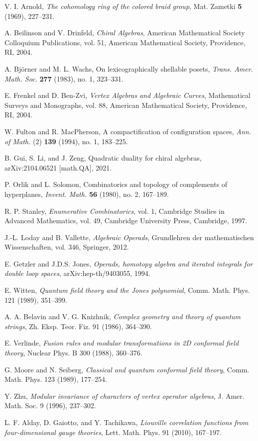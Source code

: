 

\begin{thebibliography}{99}

V. I. Arnold, \emph{The cohomology ring of the colored braid group}, 
Mat. Zametki \textbf{5} (1969), 227--231.

 A. Beilinson and V. Drinfeld, \emph{Chiral Algebras}, American Mathematical Society Colloquium Publications, vol. 51, American Mathematical Society, Providence, RI, 2004.
 
 A. Björner and M. L. Wachs, On lexicographically shellable posets, \emph{Trans. Amer. Math. Soc.} \textbf{277} (1983), no. 1, 323--331.
 
 E. Frenkel and D. Ben-Zvi, \emph{Vertex Algebras and Algebraic Curves}, Mathematical Surveys and Monographs, vol. 88, American Mathematical Society, Providence, RI, 2004.
 
 W. Fulton and R. MacPherson, A compactification of configuration spaces, \emph{Ann. of Math.} (2) \textbf{139} (1994), no. 1, 183--225.
 
 B. Gui, S. Li, and J. Zeng, Quadratic duality for chiral algebras, arXiv:2104.06521 [math.QA], 2021.
 
 P. Orlik and L. Solomon, Combinatorics and topology of complements of hyperplanes, \emph{Invent. Math.} \textbf{56} (1980), no. 2, 167--189.
 
 R. P. Stanley, \emph{Enumerative Combinatorics}, vol. 1, Cambridge Studies in Advanced Mathematics, vol. 49, Cambridge University Press, Cambridge, 1997.

 J.-L. Loday and B. Vallette, \emph{Algebraic Operads}, Grundlehren der mathematischen Wissenschaften, vol. 346, Springer, 2012.

 E. Getzler and J.D.S. Jones, \emph{Operads, homotopy algebra and iterated integrals for double loop spaces}, arXiv:hep-th/9403055, 1994.

 E. Witten, \emph{Quantum field theory and the Jones polynomial}, 
  Comm. Math. Phys. 121 (1989), 351--399.

 A. A. Belavin and V. G. Knizhnik, \emph{Complex geometry and theory of quantum strings}, 
  Zh. Eksp. Teor. Fiz. 91 (1986), 364--390.
  
 E. Verlinde, \emph{Fusion rules and modular transformations in 2D conformal field theory}, 
  Nuclear Phys. B 300 (1988), 360--376.

 G. Moore and N. Seiberg, \emph{Classical and quantum conformal field theory}, 
  Comm. Math. Phys. 123 (1989), 177--254.

 Y. Zhu, \emph{Modular invariance of characters of vertex operator algebras}, 
  J. Amer. Math. Soc. 9 (1996), 237--302.

 L. F. Alday, D. Gaiotto, and Y. Tachikawa, \emph{Liouville correlation functions from four-dimensional gauge theories}, 
  Lett. Math. Phys. 91 (2010), 167--197.
 
\end{thebibliography}
